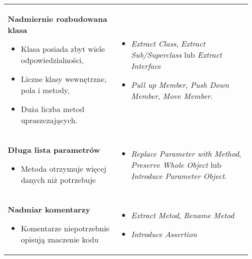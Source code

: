 \documentclass[../main.tex]{subfiles}
\begin{document}
\begin{table}[H]
\begin{center}
\begin{tabular}{ p{.35\linewidth} p{.65\linewidth} }
                \cmidrule(r){1-1}\cmidrule(l){2-2}
                \textbf{Nadmiernie rozbudowana klasa}

                \begin{itemize}
                    \item Klasa posiada zbyt wiele odpowiedzialności,
                    \item Liczne klasy wewnętrzne, pola i metody,
                    \item Duża liczba metod upraszczających.
                \end{itemize}
                &
                \begin{itemize}
                    \item \textit{Extract Class}, \textit{Extract Sub/Superclass} lub \textit{Extract Interface}
                    \item \textit{Pull up Member}, \textit{Push Down Member}, \textit{Move Member}.
                \end{itemize}
                \\

                \cmidrule(r){1-1}\cmidrule(l){2-2}
                \textbf{Długa lista parametrów}
                \begin{itemize}
                    \item Metoda otrzymuje więcej danych niż potrzebuje
                \end{itemize}
                &
                \begin{itemize}
                    \item \textit{Replace Parameter with Method}, \textit{Preserve Whole Object} lub \textit{Introduce Parameter Object}.
                \end{itemize}
                \\

                \cmidrule(r){1-1}\cmidrule(l){2-2}
                \textbf{ Nadmiar komentarzy}
                \begin{itemize}
                    \item Komentarze niepotrzebnie opisują znaczenie kodu
                \end{itemize}
                &
                \begin{itemize}
                    \item \textit{Extract Metod}, \textit{Rename Metod}
                    \item \textit{Introduce Assertion}
                \end{itemize}
                \\


\end{tabular}
\end{center}
\end{table}
\end{document}
